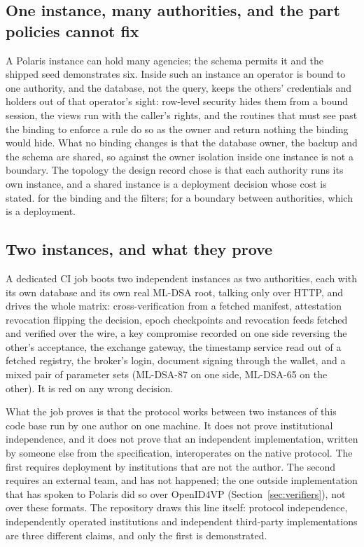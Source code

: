 \subsection{One instance, many authorities, and the part policies cannot fix}

A Polaris instance can hold many agencies; the schema permits it and the shipped seed demonstrates
six. Inside such an instance an operator is bound to one authority, and the database, not the query,
keeps the others' credentials and holders out of that operator's sight: row-level security hides
them from a bound session, the views run with the caller's rights, and the routines that must see past
the binding to enforce a rule do so as the owner and return nothing the binding would hide. What no
binding changes is that the database owner, the backup and the schema are shared, so against the owner
isolation inside one instance is not a boundary. The topology the design record
chose is that each authority runs its own instance, and a shared instance is a deployment decision
whose cost is stated. \sImplMark{} for the binding and the filters; \sExt{} for a boundary between
authorities, which is a deployment.

\subsection{Two instances, and what they prove}

A dedicated CI job boots two independent instances as two authorities, each with its own database
and its own real ML-DSA root, talking only over HTTP, and drives the whole matrix: cross-verification
from a fetched manifest, attestation revocation flipping the decision, epoch checkpoints and
revocation feeds fetched and verified over the wire, a key compromise recorded on one side reversing
the other's acceptance, the exchange gateway, the timestamp service read out of a fetched registry,
the broker's login, document signing through the wallet, and a mixed pair of parameter sets
(ML-DSA-87 on one side, ML-DSA-65 on the other). It is red on any wrong decision. \sImpl

What the job proves is that the protocol works between two instances of this code base run by one
author on one machine. It does not prove institutional independence, and it does not prove that an
independent implementation, written by someone else from the specification, interoperates on the
native protocol. The first requires deployment by institutions that are not the author. The second
requires an external team, and has not happened; the one outside implementation that has spoken to
Polaris did so over OpenID4VP (Section~\ref{sec:verifiers}), not over these formats. The repository
draws this line itself: protocol independence, independently operated institutions and independent
third-party implementations are three different claims, and only the first is demonstrated. \sExt

